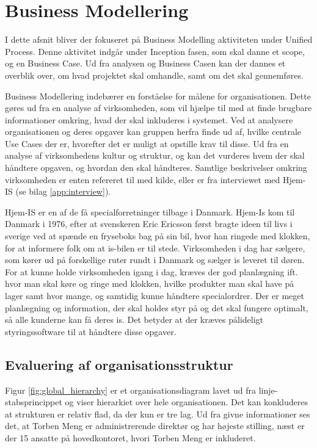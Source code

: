 \chapter{Business Modellering}\label{ch:businessanalysis}
I dette afsnit bliver der fokuseret på Business Modelling aktiviteten under Unified Process\cite{UnifiedProcess}. Denne aktivitet indgår under Inception fasen, som skal danne et scope, og en Business Case\cite{ProjectManagement}. Ud fra analysen og Business Casen kan der dannes et overblik over, om hvad projektet skal omhandle, samt om det skal gennemføres. %

Business Modellering indebærer en forståelse for målene for organisationen. Dette gøres ud fra en analyse af virksomheden, som vil hjælpe til med at finde brugbare informationer omkring, hvad der skal inkluderes i systemet\cite{UP}. Ved at analysere organisationen og deres opgaver kan gruppen herfra finde ud af, hvilke centrale Use Cases der er, hvorefter det er muligt at opstille krav til disse. Ud fra en analyse af virksomhedens kultur og struktur, og kan det vurderes hvem der skal håndtere opgaven, og hvordan den skal håndteres. Samtlige beskrivelser omkring virksomheden er enten refereret til med kilde, eller er fra interviewet med Hjem-IS (se bilag \ref{app:interview}).

Hjem-IS er en af de få specialforretninger tilbage i Danmark. Hjem-Is kom til Danmark i 1976\cite{Hjemisabout}, efter at svenskeren Eric Ericsson først bragte ideen til livs i sverige ved at spænde en fryseboks bag på sin bil, hvor han ringede med klokken, for at informere folk om at is-bilen er til stede\cite{Hjemisabout}. Virksomheden i dag har sælgere, som kører ud på forskellige ruter rundt i Danmark og sælger is leveret til døren. For at kunne holde virksomheden igang i dag, kræves der god planlægning ift. hvor man skal køre og ringe med klokken, hvilke produkter man skal have på lager samt hvor mange, og samtidig kunne håndtere specialordrer. Der er meget planlægning og information, der skal holdes styr på og det skal fungere optimalt, så alle kunderne kan få deres is. Det betyder at der kræves pålideligt styringssoftware til at håndtere disse opgaver. 

\section{Evaluering af organisationsstruktur}
Figur \ref{fig:global_hierarchy} er et organisationsdiagram lavet ud fra linje-stabsprincippet\cite{Organisation} og viser hierarkiet over hele organisationen. Det kan konkluderes at strukturen er relativ flad, da der kun er tre lag. Ud fra givne informationer ses det, at Torben Meng er administrerende direktør og har højeste stilling, næst er der 15 ansatte på hovedkontoret, hvori Torben Meng er inkluderet.

